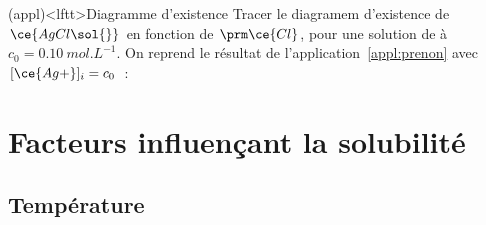 \documentclass[../../main/main.tex]{subfiles}
\begin{document}
\begin{tcb*}(appl)<lftt>{Diagramme d'existence }
  Tracer le diagramem d'existence de $\ce{AgCl\sol{}}$ en fonction de $\prm
  \ce{Cl}$, pour une solution de  à $c_0 = \SI{0.10}{mol.L^{-1}}$.
  \tcblower
      On reprend le résultat de l'application~\ref{appl:prenon} avec $[\ce{Ag+}]_i =
    c_0$~:
  \vspace{-15pt}
  \begin{center}
  \end{center}
\end{tcb*}

\section{Facteurs influençant la solubilité}
\subsection{Température}
\end{document}
